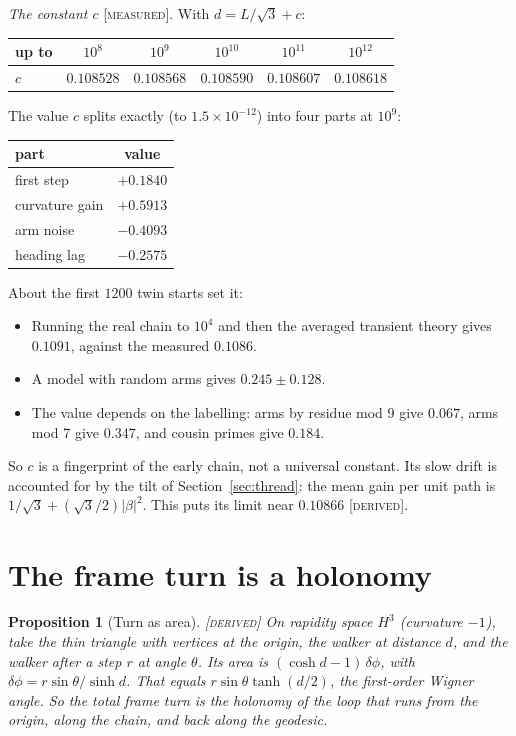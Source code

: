 \documentclass[11pt]{article}
\newtheorem{proposition}{Proposition}
\theoremstyle{definition}
\theoremstyle{remark}
\newcommand{\grade}[1]{\textsc{[#1]}}
\begin{document}
\noindent\emph{The constant $c$} \grade{measured}. With $d=L/\sqrt3+c$:

\begin{center}
\begin{tabular}{lccccc}
\toprule
up to & $10^8$ & $10^9$ & $10^{10}$ & $10^{11}$ & $10^{12}$\\
\midrule
$c$ & $0.108528$ & $0.108568$ & $0.108590$ & $0.108607$ & $0.108618$\\
\bottomrule
\end{tabular}
\end{center}

\noindent The value $c$ splits exactly (to $1.5\times10^{-12}$) into four parts at $10^9$:

\begin{center}
\begin{tabular}{lc}
\toprule
part & value\\
\midrule
first step & $+0.1840$\\
curvature gain & $+0.5913$\\
arm noise & $-0.4093$\\
heading lag & $-0.2575$\\
\bottomrule
\end{tabular}
\end{center}

About the first $1200$ twin starts set it:
\begin{itemize}
\item Running the real chain to $10^4$ and then the averaged transient theory gives $0.1091$, against the measured $0.1086$.
\item A model with random arms gives $0.245\pm0.128$.
\item The value depends on the labelling: arms by residue mod 9 give $0.067$, arms mod 7 give $0.347$, and cousin primes give $0.184$.
\end{itemize}
So $c$ is a fingerprint of the early chain, not a universal constant. Its slow drift is accounted for by the tilt of Section~\ref{sec:thread}: the mean gain per unit path is $1/\sqrt3+(\sqrt3/2)|\beta|^2$. This puts its limit near $0.10866$ \grade{derived}.

\section{The frame turn is a holonomy}

\begin{proposition}[Turn as area] \grade{derived}
On rapidity space $H^3$ (curvature $-1$), take the thin triangle with vertices at the origin, the walker at distance $d$, and the walker after a step $r$ at angle $\theta$. Its area is $(\cosh d-1)\,\delta\phi$, with $\delta\phi=r\sin\theta/\sinh d$. That equals $r\sin\theta\tanh(d/2)$, the first-order Wigner angle. So the total frame turn is the holonomy of the loop that runs from the origin, along the chain, and back along the geodesic.
\end{proposition}
\end{document}
